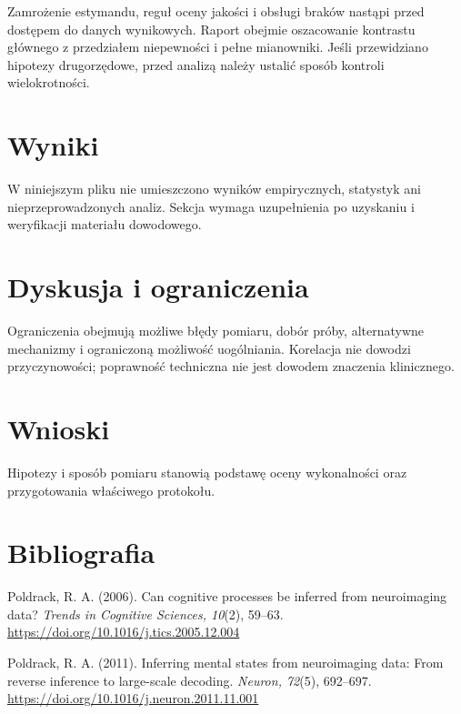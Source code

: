 \documentclass[11pt,a4paper]{article}
\begin{document}
Zamrożenie estymandu, reguł oceny jakości i obsługi braków nastąpi przed dostępem do danych wynikowych. Raport obejmie oszacowanie kontrastu głównego z przedziałem niepewności i pełne mianowniki. Jeśli przewidziano hipotezy drugorzędowe, przed analizą należy ustalić sposób kontroli wielokrotności.

\section{Wyniki}

W niniejszym pliku nie umieszczono wyników empirycznych, statystyk ani nieprzeprowadzonych analiz. Sekcja wymaga uzupełnienia po uzyskaniu i weryfikacji materiału dowodowego.

\section{Dyskusja i ograniczenia}

Ograniczenia obejmują możliwe błędy pomiaru, dobór próby, alternatywne mechanizmy i ograniczoną możliwość uogólniania. Korelacja nie dowodzi przyczynowości; poprawność techniczna nie jest dowodem znaczenia klinicznego.

\section{Wnioski}

Hipotezy i sposób pomiaru stanowią podstawę oceny wykonalności oraz przygotowania właściwego protokołu.

\section*{Bibliografia}

{\setlength{\parindent}{0pt}
\setlength{\parskip}{5pt}
\hangindent=1.27cm
Poldrack, R. A. (2006). Can cognitive processes be inferred from neuroimaging data? \textit{Trends in Cognitive Sciences, 10}(2), 59--63. \url{https://doi.org/10.1016/j.tics.2005.12.004}\par
\hangindent=1.27cm
Poldrack, R. A. (2011). Inferring mental states from neuroimaging data: From reverse inference to large-scale decoding. \textit{Neuron, 72}(5), 692--697. \url{https://doi.org/10.1016/j.neuron.2011.11.001}\par
}
\end{document}
